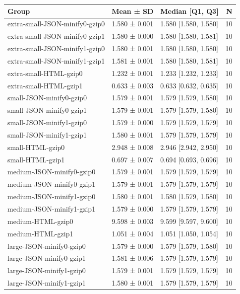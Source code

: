 \begin{tabular}{lllr}
\toprule
Group & Mean ± SD & Median [Q1, Q3] & N \\
\midrule
extra-small-JSON-minify0-gzip0 & 1.580 ± 0.001 & 1.580 [1.580, 1.580] & 10 \\
extra-small-JSON-minify0-gzip1 & 1.580 ± 0.000 & 1.580 [1.580, 1.581] & 10 \\
extra-small-JSON-minify1-gzip0 & 1.580 ± 0.001 & 1.580 [1.580, 1.580] & 10 \\
extra-small-JSON-minify1-gzip1 & 1.581 ± 0.001 & 1.580 [1.580, 1.581] & 10 \\
extra-small-HTML-gzip0 & 1.232 ± 0.001 & 1.233 [1.232, 1.233] & 10 \\
extra-small-HTML-gzip1 & 0.633 ± 0.003 & 0.633 [0.632, 0.635] & 10 \\
small-JSON-minify0-gzip0 & 1.579 ± 0.001 & 1.579 [1.579, 1.580] & 10 \\
small-JSON-minify0-gzip1 & 1.579 ± 0.001 & 1.579 [1.579, 1.580] & 10 \\
small-JSON-minify1-gzip0 & 1.579 ± 0.000 & 1.579 [1.579, 1.579] & 10 \\
small-JSON-minify1-gzip1 & 1.580 ± 0.001 & 1.579 [1.579, 1.579] & 10 \\
small-HTML-gzip0 & 2.948 ± 0.008 & 2.946 [2.942, 2.950] & 10 \\
small-HTML-gzip1 & 0.697 ± 0.007 & 0.694 [0.693, 0.696] & 10 \\
medium-JSON-minify0-gzip0 & 1.579 ± 0.001 & 1.579 [1.579, 1.579] & 10 \\
medium-JSON-minify0-gzip1 & 1.579 ± 0.001 & 1.579 [1.579, 1.579] & 10 \\
medium-JSON-minify1-gzip0 & 1.580 ± 0.001 & 1.580 [1.579, 1.580] & 10 \\
medium-JSON-minify1-gzip1 & 1.579 ± 0.000 & 1.579 [1.579, 1.579] & 10 \\
medium-HTML-gzip0 & 9.598 ± 0.003 & 9.599 [9.597, 9.600] & 10 \\
medium-HTML-gzip1 & 1.051 ± 0.004 & 1.051 [1.050, 1.054] & 10 \\
large-JSON-minify0-gzip0 & 1.579 ± 0.000 & 1.579 [1.579, 1.580] & 10 \\
large-JSON-minify0-gzip1 & 1.581 ± 0.006 & 1.579 [1.579, 1.579] & 10 \\
large-JSON-minify1-gzip0 & 1.579 ± 0.001 & 1.579 [1.579, 1.579] & 10 \\
large-JSON-minify1-gzip1 & 1.580 ± 0.001 & 1.579 [1.579, 1.579] & 10 \\

\end{tabular}
